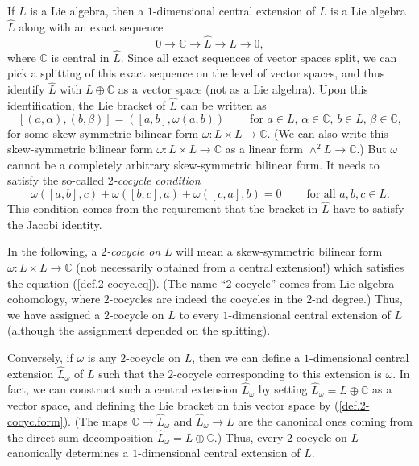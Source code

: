 \documentclass[etingof-lie.tex]{subfiles}
\begin{document}
\begin{definition}
\label{def.centex}If $L$ is a Lie algebra, then a $1$-dimensional central
extension of $L$ is a Lie algebra $\widehat{L}$ along with an exact sequence%
\begin{equation}
0\rightarrow\mathbb{C}\rightarrow\widehat{L}\rightarrow L\rightarrow0,
\label{def.2-cocyc.es}%
\end{equation}
where $\mathbb{C}$ is central in $\widehat{L}$. Since all exact sequences of
vector spaces split, we can pick a splitting of this exact sequence on the
level of vector spaces, and thus identify $\widehat{L}$ with $L\oplus
\mathbb{C}$ as a vector space (not as a Lie algebra). Upon this
identification, the Lie bracket of $\widehat{L}$ can be written as%
\begin{equation}
\left[  \left(  a,\alpha\right)  ,\left(  b,\beta\right)  \right]  =\left(
\left[  a,b\right]  ,\omega\left(  a,b\right)  \right)
\ \ \ \ \ \ \ \ \ \ \text{for }a\in L\text{, }\alpha\in\mathbb{C}\text{, }b\in
L\text{, }\beta\in\mathbb{C}, \label{def.2-cocyc.form}%
\end{equation}
for some skew-symmetric bilinear form $\omega:L\times L\rightarrow\mathbb{C}$.
(We can also write this skew-symmetric bilinear form $\omega:L\times
L\rightarrow\mathbb{C}$ as a linear form $\wedge^{2}L\rightarrow\mathbb{C}$.)
But $\omega$ cannot be a completely arbitrary skew-symmetric bilinear form. It
needs to satisfy the so-called $2$\textit{-cocycle condition}%
\begin{equation}
\omega\left(  \left[  a,b\right]  ,c\right)  +\omega\left(  \left[
b,c\right]  ,a\right)  +\omega\left(  \left[  c,a\right]  ,b\right)
=0\ \ \ \ \ \ \ \ \ \ \text{for all }a,b,c\in L. \label{def.2-cocyc.eq}%
\end{equation}
This condition comes from the requirement that the bracket in $\widehat{L}$
have to satisfy the Jacobi identity.

In the following, a $2$\textit{-cocycle on }$L$ will mean a skew-symmetric
bilinear form $\omega:L\times L\rightarrow\mathbb{C}$ (not necessarily
obtained from a central extension!) which satisfies the equation
(\ref{def.2-cocyc.eq}). (The name ``$2$-cocycle'' comes from Lie algebra
cohomology, where $2$-cocycles are indeed the cocycles in the $2$-nd degree.)
Thus, we have assigned a $2$-cocycle on $L$ to every $1$-dimensional central
extension of $L$ (although the assignment depended on the splitting).

Conversely, if $\omega$ is any $2$-cocycle on $L$, then we can define a
$1$-dimensional central extension $\widehat{L}_{\omega}$ of $L$ such that the
$2$-cocycle corresponding to this extension is $\omega$. In fact, we can
construct such a central extension $\widehat{L}_{\omega}$ by setting
$\widehat{L}_{\omega}=L\oplus\mathbb{C}$ as a vector space, and defining the
Lie bracket on this vector space by (\ref{def.2-cocyc.form}). (The maps
$\mathbb{C}\rightarrow\widehat{L}_{\omega}$ and $\widehat{L}_{\omega
}\rightarrow L$ are the canonical ones coming from the direct sum
decomposition $\widehat{L}_{\omega}=L\oplus\mathbb{C}$.) Thus, every
$2$-cocycle on $L$ canonically determines a $1$-dimensional central extension
of $L$.


\end{definition}
\end{document}
